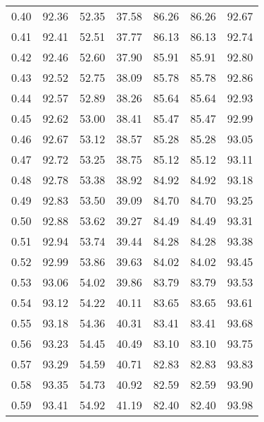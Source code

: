 \begin{tabular}{|c|c|c|c|c|c|c|}
      0.40 &     92.36 &     52.35 &      37.58 &   86.26 &      86.26 &         92.67 \\
      0.41 &     92.41 &     52.51 &      37.77 &   86.13 &      86.13 &         92.74 \\
      0.42 &     92.46 &     52.60 &      37.90 &   85.91 &      85.91 &         92.80 \\
      0.43 &     92.52 &     52.75 &      38.09 &   85.78 &      85.78 &         92.86 \\
      0.44 &     92.57 &     52.89 &      38.26 &   85.64 &      85.64 &         92.93 \\
      0.45 &     92.62 &     53.00 &      38.41 &   85.47 &      85.47 &         92.99 \\
      0.46 &     92.67 &     53.12 &      38.57 &   85.28 &      85.28 &         93.05 \\
      0.47 &     92.72 &     53.25 &      38.75 &   85.12 &      85.12 &         93.11 \\
      0.48 &     92.78 &     53.38 &      38.92 &   84.92 &      84.92 &         93.18 \\
      0.49 &     92.83 &     53.50 &      39.09 &   84.70 &      84.70 &         93.25 \\
      0.50 &     92.88 &     53.62 &      39.27 &   84.49 &      84.49 &         93.31 \\
      0.51 &     92.94 &     53.74 &      39.44 &   84.28 &      84.28 &         93.38 \\
      0.52 &     92.99 &     53.86 &      39.63 &   84.02 &      84.02 &         93.45 \\
      0.53 &     93.06 &     54.02 &      39.86 &   83.79 &      83.79 &         93.53 \\
      0.54 &     93.12 &     54.22 &      40.11 &   83.65 &      83.65 &         93.61 \\
      0.55 &     93.18 &     54.36 &      40.31 &   83.41 &      83.41 &         93.68 \\
      0.56 &     93.23 &     54.45 &      40.49 &   83.10 &      83.10 &         93.75 \\
      0.57 &     93.29 &     54.59 &      40.71 &   82.83 &      82.83 &         93.83 \\
      0.58 &     93.35 &     54.73 &      40.92 &   82.59 &      82.59 &         93.90 \\
      0.59 &     93.41 &     54.92 &      41.19 &   82.40 &      82.40 &         93.98 \\

\end{tabular}
